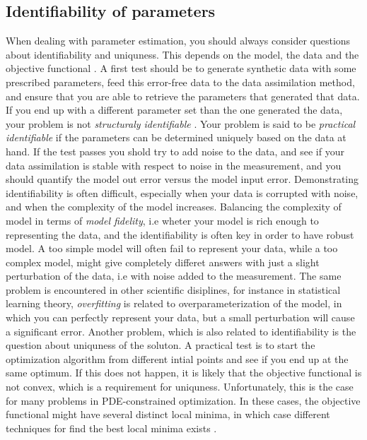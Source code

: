 \subsection{Identifiability of parameters}
When dealing with parameter estimation, you should always consider
questions about identifiability and uniquness. This depends on the
model, the data and the objective functional
\cite{hadjicharalambous2015analysis}. A first test should be to
generate synthetic data with some prescribed parameters, feed this
error-free data to the data assimilation method, and ensure that you
are able to retrieve the parameters that generated that data. If you
end up with a different parameter set than the one generated the data,
your problem is not \emph{structuraly identifiable}
\cite{chabiniok2016multiphysics}. Your problem is said to be
\emph{practical identifiable} if the parameters can be determined
uniquely based on the data at hand. If the test passes you shold try
to add noise to the data, and see if your data assimilation is stable
with respect to noise in the measurement, and you should quantify the
model out error versus the model input error. Demonstrating identifiability is
often difficult, especially when your data is corrupted with noise,
and when the complexity of the model increases. Balancing the
complexity of model in terms of \emph{model fidelity}, i.e wheter your
model is rich enough to representing the data, and the identifiability
is often key in order to have robust model. A too simple model will
often fail to represent your data, while a too complex model, might
give completely differet answers with just a slight perturbation of
the data, i.e with noise added to the measurement. The same problem is
encountered in other scientific disiplines, for instance in
statistical learning theory, \emph{overfitting} is related to
overparameterization of the model, in which you can perfectly
represent your data, but a small perturbation will cause a significant
error. Another problem, which is also related to identifiability is
the question about uniquness of the soluton. A practical test is to
start the optimization algorithm from different intial points and see
if you end up at the same optimum. If this does not happen, it is
likely that the objective functional is not convex, which is a
requirement for uniquness. Unfortunately, this is the case for many
problems in PDE-constrained optimization. In these cases, the objective
functional might have several distinct local minima, in which case
different techniques for find the best local minima exists
\cite{farrell2015multiple}. 

